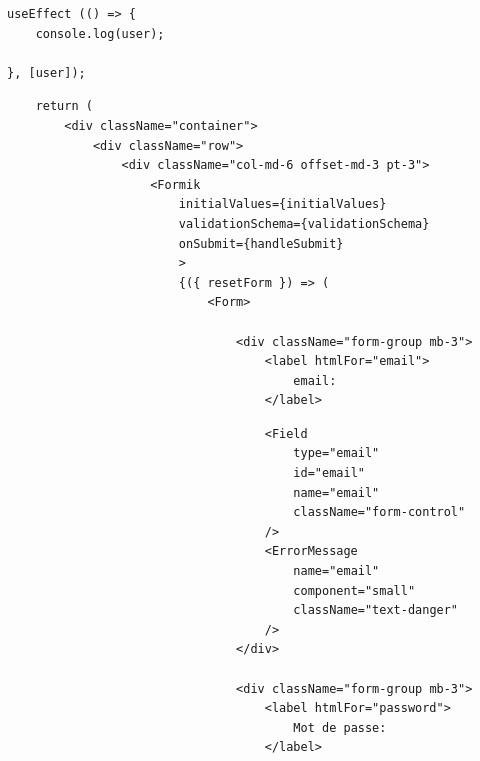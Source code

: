 \documentclass[5pt]{beamer}
\begin{document}
{\begin{frame}[fragile]{}
\begin{block}{}
\begin{verbatim}
useEffect (() => {  
    console.log(user);
    
}, [user]);
\end{verbatim}

\end{block}
\end{frame}

\begin{frame}[fragile]{}
\begin{block}{}
\begin{verbatim}
    return (
        <div className="container">
            <div className="row">
                <div className="col-md-6 offset-md-3 pt-3">
                    <Formik
                        initialValues={initialValues}
                        validationSchema={validationSchema}
                        onSubmit={handleSubmit}
                        >
                        {({ resetForm }) => (
                            <Form>
                                
                                <div className="form-group mb-3">
                                    <label htmlFor="email">
                                        email:
                                    </label>
                                    \end{verbatim}

\end{block}
\end{frame}

\begin{frame}[fragile]{}
\begin{block}{}
\begin{verbatim}
                                    <Field
                                        type="email"
                                        id="email"
                                        name="email"
                                        className="form-control"
                                    />
                                    <ErrorMessage
                                        name="email"
                                        component="small"
                                        className="text-danger"
                                    />
                                </div>
                              
                                <div className="form-group mb-3">
                                    <label htmlFor="password">
                                        Mot de passe:
                                    </label>
                                    \end{verbatim}


\end{block}
\end{frame}}
\end{document}
